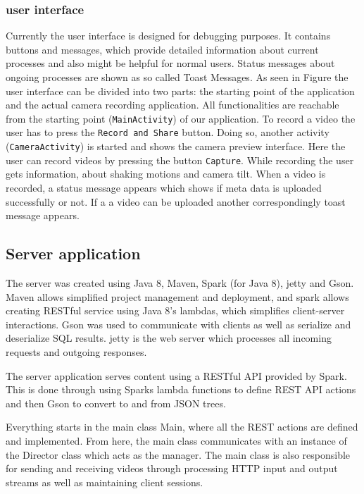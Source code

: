 \documentclass[conference]{IEEEtran}
\begin{document}
\subsubsection{user interface}

Currently the user interface is designed for debugging purposes.
It contains buttons and messages, which provide detailed information about current processes and also might be helpful for normal users.
Status messages about ongoing processes are shown as so called Toast Messages. 
As seen in Figure the user interface can be divided into two parts: the starting point of the application and the actual camera recording application.
All functionalities are reachable from the starting point (\texttt{MainActivity}) of our application. To record a video the user has to press the \texttt{Record and Share} button.
Doing so, another activity (\texttt{CameraActivity}) is started and shows the camera preview interface. Here the user can record videos by pressing the button \texttt{Capture}. While recording the user gets information, about shaking motions and camera tilt. When a video is recorded, a status message appears which shows if meta data is uploaded successfully or not. If a a video can be uploaded another correspondingly toast message appears.





\subsection{Server application}

The server was created using Java 8, Maven, Spark (for Java 8), jetty and Gson. Maven allows simplified project
management and deployment, and spark allows creating RESTful service using Java 8's lambdas, which
simplifies client-server interactions. Gson was used to communicate with clients as well as serialize
and deserialize SQL results. jetty is the web server which processes all incoming requests and outgoing responses.

The server application serves content using a RESTful API provided by Spark. This is done through using Sparks
lambda functions to define REST API actions and then Gson to convert to and from JSON trees.

Everything starts in the main class Main, where all the REST actions are defined and implemented. From here,
the main class communicates with an instance of the Director class which acts as the manager. The main
class is also responsible for sending and receiving videos through processing HTTP input and output streams
as well as maintaining client sessions.
\end{document}
